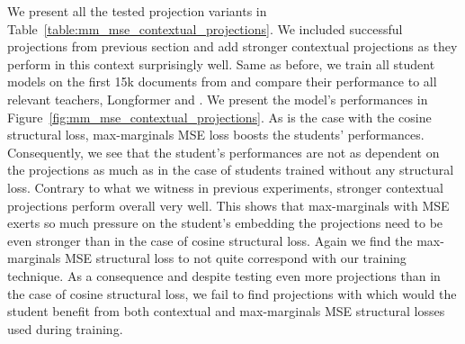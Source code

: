 We present all the tested projection variants in
Table~\ref{table:mm_mse_contextual_projections}. We included successful
projections from previous section and add stronger contextual projections as
they perform in this context surprisingly well. Same as before, we train all
student models on the first 15k documents from  and compare
their performance to all relevant teachers, Longformer and
. We present the model's performances in
Figure~\ref{fig:mm_mse_contextual_projections}. As is the case with the cosine
structural loss, max-marginals MSE loss boosts the students' performances.
Consequently, we see that the student's performances are not as dependent on
the projections as much as in the case of students trained without any
structural loss. Contrary to what we witness in previous experiments, stronger
contextual projections perform overall very well. This shows that max-marginals
with MSE exerts so much pressure on the student's embedding the projections
need to be even stronger than in the case of cosine structural loss. Again we
find the max-marginals MSE structural loss to not quite correspond with our
training technique. As a consequence and despite testing even more projections
than in the case of cosine structural loss, we fail to find projections with
which would the student benefit from both contextual and max-marginals MSE
structural losses used during training.

